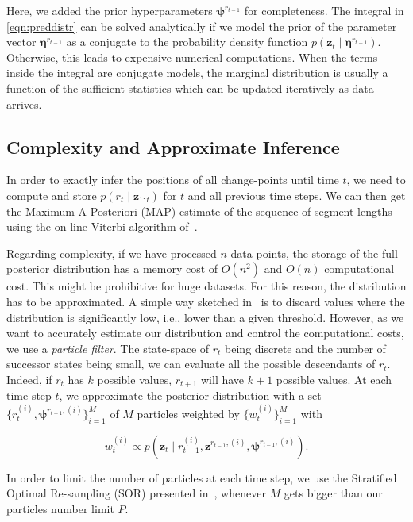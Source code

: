 Here, we added the prior hyperparameters $\boldsymbol{\psi}^{r_{t-1}}$ for
completeness. The integral in \eqref{eqn:preddistr} can be solved analytically
if we model the prior of the parameter vector $\boldsymbol{\eta}^{r_{t-1}}$ as a
conjugate to the probability density function $p(\mathbf{z}_t\mid
\boldsymbol{\eta}^{r_{t-1}})$. Otherwise, this leads to expensive numerical
computations. When the terms inside the integral are conjugate models, the
marginal distribution is usually a function of the sufficient statistics which
can be updated iteratively as data arrives.

\subsection{Complexity and Approximate Inference}
In order to exactly infer the positions of all change-points until time $t$, we
need to compute and store $p(r_t\mid \mathbf{z}_{1:t})$ for $t$ and all previous
time steps. We can then get the Maximum A Posteriori (MAP) estimate of the
sequence of segment lengths using the on-line Viterbi
algorithm of~\cite{fearnhead07online}.

Regarding complexity, if we have processed $n$ data points, the storage of the
full posterior distribution has a memory cost of $O(n^2)$ and $O(n)$
computational cost. This might be prohibitive for huge datasets. For this
reason, the distribution has to be approximated. A simple way sketched
in~\cite{adams07bayesian} is to discard values where the distribution is
significantly low, i.e., lower than a given threshold. However, as we want to
accurately estimate our distribution and control the computational costs, we use
a \emph{particle filter}. The state-space of $r_t$ being discrete and the number
of successor states being small, we can evaluate all the possible descendants of
$r_t$. Indeed, if $r_t$ has $k$ possible values, $r_{t+1}$ will have $k+1$
possible values. At each time step $t$, we approximate the posterior
distribution with a set $\{r_t^{(i)},\boldsymbol{\psi}^{r_{t-1},(i)}\}_{i=1}^M$ of
$M$ particles weighted by $\{w_t^{(i)}\}_{i=1}^M$ with

\begin{equation}
\label{eqn:weight}
w_t^{(i)} \propto p(\mathbf{z}_t\mid r_{t-1}^{(i)},\mathbf{z}^{r_{t-1},(i)},
\boldsymbol{\psi}^{r_{t-1},(i)}).
\end{equation}

In order to limit the number of particles at each time step, we use the
Stratified Optimal Re-sampling (SOR) presented in~\cite{fearnhead07online},
whenever $M$ gets bigger than our particles number limit $P$.

